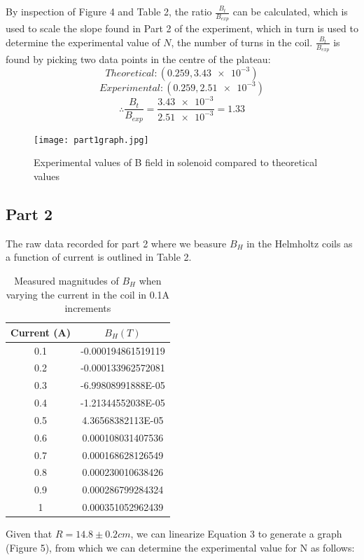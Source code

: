 \documentclass[letterpaper]{article}
\begin{document}
By inspection of Figure 4 and Table 2, the ratio $\frac{B_t}{B_{exp}}$ can
be calculated, which is used to scale the slope found in Part 2 of the experiment,
which in turn is used to determine the experimental value of $N$, the number of turns in the coil.
$\frac{B_t}{B_{exp}}$ is found by picking two data points in the centre of the plateau:
$${Theoretical: } (0.259, \num{3.43e-3})$$
$${Experimental: } (0.259, \num{2.51e-3})$$
$$\therefore \frac{B_t}{B_{exp}}= \frac{\num{3.43e-3}}{\num{2.51e-3}}=1.33$$
\begin{figure}[H]
 \centering
 \texttt{[image: part1graph.jpg]}
 \caption{Experimental values of B field in solenoid compared to theoretical values}
\end{figure}


\subsection{Part 2}

The raw data recorded for part 2 where we beasure $B_H$ in the
Helmholtz coils as a function of current is outlined in Table 2.

\begin{table}[H]
 \centering
 \begin{tabular}{|c|c|}
  \hline
  Current (A) & $B_H (T)$          \\ \hline
  0.1         & -0.000194861519119 \\ \hline
  0.2         & -0.000133962572081 \\ \hline
  0.3         & -6.99808991888E-05 \\ \hline
  0.4         & -1.21344552038E-05 \\ \hline
  0.5         & 4.36568382113E-05  \\ \hline
  0.6         & 0.000108031407536  \\ \hline
  0.7         & 0.000168628126549  \\ \hline
  0.8         & 0.000230010638426  \\ \hline
  0.9         & 0.000286799284324  \\ \hline
  1           & 0.000351052962439  \\ \hline
 \end{tabular}
 \caption{Measured magnitudes of $B_H$ when varying the current in the coil in 0.1A increments}
\end{table}

Given that $R=14.8 \pm 0.2 cm$, we can linearize Equation 3 to
generate a graph (Figure 5), from which we can determine the experimental
value for N  as follows:
\end{document}
